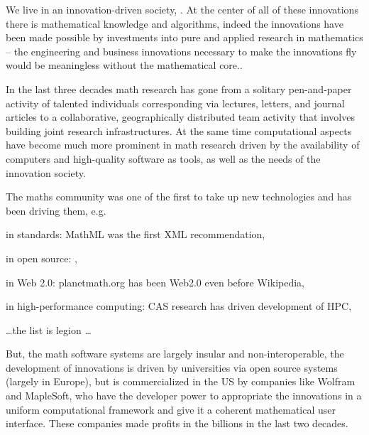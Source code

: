 \documentclass[noworkareas,deliverables,keys]{euproposal}                  %
\begin{document}
\begin{proposal}
We live in an innovation-driven society, . At the center of all of these innovations there is mathematical
knowledge and algorithms, indeed the innovations have been made possible by investments
into pure and applied research in mathematics -- the engineering and business innovations
necessary to make the innovations fly would be meaningless without the mathematical
core..
 
In the last three decades math research has gone from a solitary pen-and-paper activity of
talented individuals corresponding via lectures, letters, and journal articles to a
collaborative, geographically distributed team activity that involves building joint
research infrastructures. At the same time computational aspects have become much more
prominent in math research driven by the availability of computers and high-quality
software as tools, as well as the needs of the innovation society.

The maths community was one of the first to take up new technologies and has been driving
them, e.g.
\begin{compactenum}[\em i)\rm]
\item in standards: MathML was the first XML recommendation,
\item in open source: ,
\item in Web 2.0: planetmath.org has been Web2.0 even before Wikipedia,
\item in high-performance computing: CAS research has driven development of HPC,
\item \ldots the list is legion \ldots
\end{compactenum}

But, the math software systems are largely insular and non-interoperable, the development
of innovations is driven by universities via open source systems (largely in Europe), but
is commercialized in the US by companies like Wolfram and MapleSoft, who have the
developer power to appropriate the innovations in a uniform computational framework and
give it a coherent mathematical user interface. These companies made profits in the
billions in the last two decades.


\end{proposal}
\end{document}
